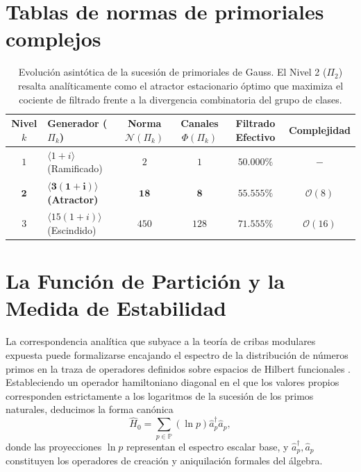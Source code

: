\documentclass{article}
\numberwithin{equation}{section}
\theoremstyle{plain}
\theoremstyle{definition}
\begin{document}
\appendix

\section{Tablas de normas de primoriales complejos}
\label{apendice:tablas_primoriales}

\begin{table}[h!]
\centering
\renewcommand{\arraystretch}{1.5}
\begin{tabular}{|c|l|c|c|c|c|}
\hline
\textbf{Nivel $k$} & \textbf{Generador ($\Pi_k$)} & \textbf{Norma $\mathcal{N}(\Pi_k)$} & \textbf{Canales $\Phi(\Pi_k)$} & \textbf{Filtrado Efectivo} & \textbf{Complejidad} \\
\hline\hline
$1$ & $\langle 1+i \rangle$ (Ramificado) & $2$ & $1$ & $50.000\%$ & $-$ \\
\hline
$\mathbf{2}$ & $\mathbf{\langle 3(1+i) \rangle}$ \textbf{(Atractor)} & $\mathbf{18}$ & $\mathbf{8}$ & $\mathbf{55.555\%}$ & $\mathcal{O}(8)$ \\
\hline
$3$ & $\langle 15(1+i) \rangle$ (Escindido) & $450$ & $128$ & $71.555\%$ & $\mathcal{O}(16)$ \\
\hline
\end{tabular}
\caption{Evolución asintótica de la sucesión de primoriales de Gauss. El Nivel 2 ($\Pi_2$) resalta analíticamente como el atractor estacionario óptimo que maximiza el cociente de filtrado frente a la divergencia combinatoria del grupo de clases.}
\label{tabla:primoriales_gauss}
\end{table}

\section{La Función de Partición y la Medida de Estabilidad}
\label{apendice:hamiltoniano_primones}

La correspondencia analítica que subyace a la teoría de cribas modulares expuesta puede formalizarse encajando el espectro de la distribución de números primos en la traza de operadores definidos sobre espacios de Hilbert funcionales \cite{Julia1990}. Estableciendo un operador hamiltoniano diagonal en el que los valores propios corresponden estrictamente a los logaritmos de la sucesión de los primos naturales, deducimos la forma canónica
\begin{equation}
    \hat{H}_0 = \sum_{p \in \mathbb{P}} (\ln p) \hat{a}_p^\dagger \hat{a}_p,
\end{equation}
donde las proyecciones $\ln p$ representan el espectro escalar base, y $\hat{a}_p^\dagger, \hat{a}_p$ constituyen los operadores de creación y aniquilación formales del álgebra.
\end{document}
